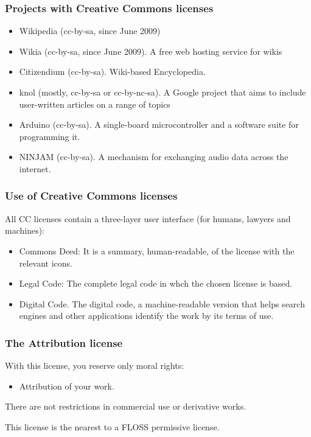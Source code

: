 \begin{frame}
\frametitle{Projects with Creative Commons licenses}

\begin{itemize}
\item \alert{Wikipedia} (cc-by-sa, since June 2009)
\item \alert{Wikia} (cc-by-sa, since June 2009). A free web hosting service for wikis
\item \alert{Citizendium} (cc-by-sa). Wiki-based Encyclopedia.
\item \alert{knol} (mostly, cc-by-sa or cc-by-nc-sa). A Google project that aims to include user-written articles on a range of topics
\item \alert{Arduino} (cc-by-sa). A single-board microcontroller and a software suite for programming it. 
\item \alert{NINJAM} (cc-by-sa). A mechanism for exchanging audio data across the internet.
\end{itemize}                                                 

\end{frame}



\begin{frame}
\frametitle{Use of Creative Commons licenses}

All CC licenses contain a \alert{three-layer user interface} (for humans, lawyers and machines):
\begin{itemize}
\item \alert{Commons Deed:} It is a summary, human-readable, of the license with the relevant icons.
\item \alert{Legal Code:} The complete legal code in whch the chosen license is based.
\item \alert{Digital Code.} The digital code, a machine-readable version that helps search engines and other applications identify the work by its terms of use.
\end{itemize}                                                 

\end{frame}


\begin{frame}
\frametitle{The Attribution license}

With this license, you reserve only moral rights:

\begin{itemize}
\item Attribution of your work.
\end{itemize}

There are not restrictions in commercial use or derivative works.

This license is the nearest to a FLOSS permissive license. 

\end{frame}


